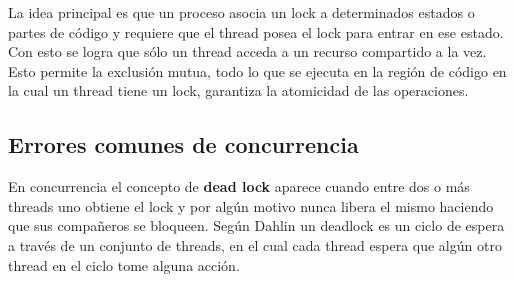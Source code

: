 \documentclass[../main.tex]{subfiles}
\begin{document}
        La idea principal es que un proceso asocia un lock a determinados estados o partes de código y requiere que el thread posea el lock para entrar en ese estado. Con esto se logra que sólo un thread acceda a un recurso compartido a la vez.\\

        Esto permite la exclusión mutua, todo lo que se ejecuta en la región de código en la cual un thread tiene un lock, garantiza la atomicidad de las operaciones.
    
    \subsection{Errores comunes de concurrencia}
        En concurrencia el concepto de \textbf{dead lock} aparece cuando entre dos o más threads uno obtiene el lock y por algún motivo nunca libera el mismo haciendo que sus compañeros se bloqueen. Según Dahlin un deadlock es un ciclo de espera a través de un conjunto de threads, en el cual cada thread espera que algún otro thread en el ciclo tome alguna acción.
\end{document}
